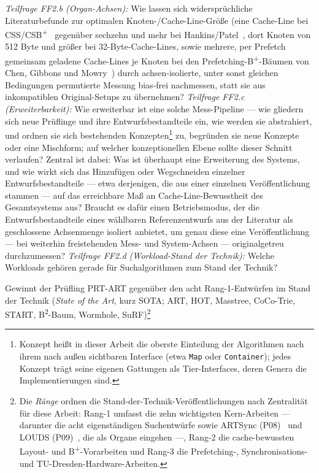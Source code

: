 \begin{description}
  \emph{Teilfrage FF2.b (Organ-Achsen):} Wie lassen sich widersprüchliche Literaturbefunde zur optimalen
  Knoten-/Cache-Line-Größe (eine Cache-Line bei CSS/CSB\textsuperscript{+}~\cite{rao1999css, rao2000csb}
  gegenüber sechzehn und mehr bei Hankins/Patel~\cite{hankins2003nodesize}, dort Knoten von 512 Byte und
  größer bei 32-Byte-Cache-Lines, sowie mehrere, per Prefetch gemeinsam geladene Cache-Lines je Knoten
  bei den Prefetching-B\textsuperscript{+}-Bäumen von Chen, Gibbons und Mowry~\cite{chen2001prefetch})
  durch achsen-isolierte, unter
  sonst gleichen Bedingungen permutierte Messung
  bias-frei nachmessen, statt sie aus inkompatiblen Original-Setups zu übernehmen?
  \emph{Teilfrage FF2.c (Erweiterbarkeit):} Wie erweiterbar ist eine solche Mess-Pipeline --- wie
  gliedern sich neue Prüflinge und ihre Entwurfsbestandteile ein, wie werden sie abstrahiert, und
  ordnen sie sich bestehenden Konzepten\footnote{Konzept heißt in dieser Arbeit die oberste
  Einteilung der Algorithmen nach ihrem nach außen sichtbaren Interface (etwa \texttt{Map} oder
  \texttt{Container}); jedes Konzept trägt seine eigenen Gattungen als Tier-Interfaces, deren Genera
  die Implementierungen sind.} zu,
  begründen sie neue Konzepte oder eine
  Mischform; auf welcher konzeptionellen Ebene sollte dieser Schnitt verlaufen? Zentral ist dabei:
  Was ist überhaupt eine Erweiterung des Systems, und wie wirkt sich das Hinzufügen oder
  Wegschneiden einzelner Entwurfsbestandteile --- etwa derjenigen, die aus einer einzelnen
  Veröffentlichung stammen --- auf das erreichbare Maß an Cache-Line-Bewusstheit des
  Gesamtsystems aus? Braucht es
  dafür einen Betriebsmodus, der die Entwurfsbestandteile eines wählbaren Referenzentwurfs aus der
  Literatur als geschlossene Achsenmenge isoliert anbietet, um genau diese eine Veröffentlichung
  --- bei weiterhin freistehenden Mess- und System-Achsen --- originalgetreu durchzumessen?
  \emph{Teilfrage FF2.d (Workload-Stand der Technik):} Welche Workloads gehören gerade für
  Suchalgorithmen zum Stand der Technik?
  \item[FF3 (Prüfling-Vergleich)] Gewinnt der Prüfling PRT-ART gegenüber den acht Rang-1-Entwürfen
  im Stand der Technik (\emph{State of the Art}, kurz SOTA\@; ART, HOT, Masstree, CoCo-Trie, START,
  B\textsuperscript{2}-Baum, Wormhole,
  SuRF)\footnote{Die \emph{Ränge} ordnen die Stand-der-Technik-Veröffentlichungen nach Zentralität für diese Arbeit: Rang-1 umfasst die zehn wichtigsten Kern-Arbeiten --- darunter die acht eigenständigen Suchentwürfe sowie ARTSync (P08)~\cite{leis2016olc} und LOUDS (P09)~\cite{jacobson1989louds}, die als Organe eingehen ---, Rang-2 die cache-bewussten Layout- und B\textsuperscript{+}-Vorarbeiten und Rang-3 die Prefetching-, Synchronisations- und TU-Dresden-Hardware-Arbeiten.}

\end{description}
